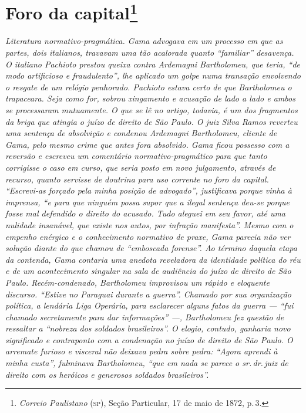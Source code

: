 \chapter{Foro da capital\footnote{\emph{Correio Paulistano} (\textsc{sp}), Seção Particular,
  17 de maio de 1872, p.\,3.}} %

\begin{didascalia}
\emph{Literatura normativo-pragmática. Gama advogava em um processo em
que as partes, dois italianos, travavam uma tão acalorada quanto
``familiar'' desavença. O italiano Pachioto prestou queixa contra
Ardemagni Bartholomeu, que teria, ``de modo artificioso e fraudulento'',
lhe aplicado um golpe numa transação envolvendo o resgate de um relógio
penhorado. Pachioto estava certo de que Bartholomeu o trapaceara. Seja
como for, sobrou xingamento e acusação de lado a lado e ambos se
processaram mutuamente. O que se lê no artigo, todavia, é um dos
fragmentos da briga que atingia o juízo de direito de São Paulo. O juiz
Silva Ramos reverteu uma sentença de absolvição e condenou Ardemagni
Bartholomeu, cliente de Gama, pelo mesmo crime que antes fora absolvido.
Gama ficou possesso com a reversão e escreveu um comentário
normativo-pragmático para que tanto corrigisse o caso em curso, que
seria posto em novo julgamento, através de recurso, quanto servisse de
doutrina para uso corrente no foro da capital. ``Escrevi-as forçado pela
minha posição de advogado'', justificava porque vinha à imprensa, ``e para
que ninguém possa supor que a ilegal sentença deu-se porque fosse mal
defendido o direito do acusado. Tudo aleguei em seu favor, até uma
nulidade insanável, que existe nos autos, por infração manifesta''. Mesmo
com o empenho enérgico e o conhecimento normativo de praxe, Gama parecia
não ver solução diante do que chamou de ``emboscada forense''. Ao término
daquela etapa da contenda, Gama contaria uma anedota reveladora da
identidade política do réu e de um acontecimento singular na sala de
audiência do juízo de direito de São Paulo. Recém-condenado, Bartholomeu
improvisou um rápido e eloquente discurso. ``Estive no Paraguai durante a
guerra''. Chamado por sua organização política, a lendária Liga Operária,
para esclarecer alguns fatos da guerra --- ``fui chamado secretamente para
dar informações'' ---, Bartholomeu fez questão de ressaltar a ``nobreza dos
soldados brasileiros''. O elogio, contudo, ganharia novo significado e
contraponto com a condenação no juízo de direito de São Paulo. O
arremate furioso e visceral não deixava pedra sobre pedra: ``Agora
aprendi à minha custa'', fulminava Bartholomeu, ``que em nada se parece o
sr.\,dr.\,juiz de direito com os heróicos e generosos soldados
brasileiros''.}
\end{didascalia}

